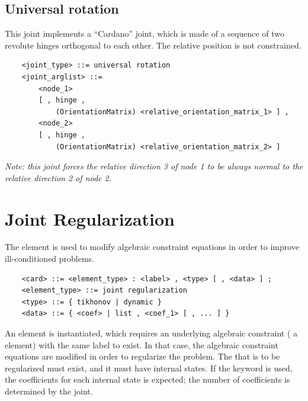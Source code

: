 \subsection{Universal rotation}
\label{sec:EL:STRUCT:JOINT:UNIVERSAL_ROTATION}
This joint implements a ``Cardano'' joint, which is made of a sequence
of two revolute hinges orthogonal to each other.
The relative position is not constrained.
\begin{verbatim}
    <joint_type> ::= universal rotation
    <joint_arglist> ::= 
        <node_1>
        [ , hinge , 
            (OrientationMatrix) <relative_orientation_matrix_1> ] ,
        <node_2>
        [ , hinge , 
            (OrientationMatrix) <relative_orientation_matrix_2> ]
\end{verbatim}
{\em
    Note: this joint forces the relative direction 3 of node 1 to be always 
    normal to the relative direction 2 of node 2.
}

\section{Joint Regularization}
The  element is used to modify
algebraic constraint equations in order to improve ill-conditioned
problems.
\begin{verbatim}
    <card> ::= <element_type> : <label> , <type> [ , <data> ] ;
    <element_type> ::= joint regularization
    <type> ::= { tikhonov | dynamic }
    <data> ::= { <coef> | list , <coef_1> [ , ... ] }
\end{verbatim}
An element is instantiated, which requires
an underlying algebraic constraint ( a  element)
with the same label to exist.
In that case, the algebraic constraint equations are modified
in order to regularize the problem.
The  that is to be regularized must exist,
and it must have internal states.
If the keyword  is used, the coefficients for each internal state
is expected; the number of coefficients is determined by the joint.

